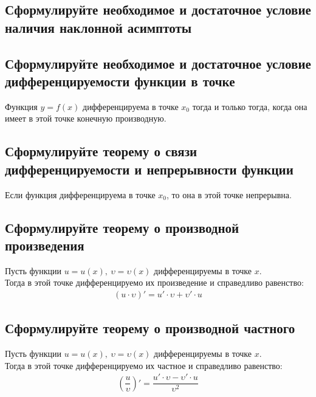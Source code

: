 \subsection{Сформулируйте необходимое и достаточное условие наличия наклонной асимптоты}
\begin{theorem}

\end{theorem}

\subsection{Сформулируйте необходимое и достаточное условие дифференцируемости функции в точке}
\begin{theorem}
	Функция $y=f(x)$ дифференцируема в точке $x_0$ тогда и только тогда, когда она имеет в этой точке конечную производную.
\end{theorem}

\subsection{Сформулируйте теорему о связи дифференцируемости и непрерывности функции}
\begin{theorem} 
	Если функция дифференцируема в точке $x_0$, то она в этой точке непрерывна.
\end{theorem}

\subsection{Сформулируйте теорему о производной произведения}
\begin{theorem}
	Пусть функции $u = u(x),\ \upsilon = \upsilon (x)$ дифференцируемы в точке $x$.\\
	Тогда в этой точке дифференцируемо их произведение и справедливо равенство:
	\begin{gather*}
		(u \cdot \upsilon)' = u'\cdot \upsilon + \upsilon' \cdot u
	\end{gather*}
\end{theorem}

\subsection{Сформулируйте теорему о производной частного}
\begin{theorem}
	Пусть функции $u = u(x),\ \upsilon = \upsilon (x)$ дифференцируемы в точке $x$.\\
	Тогда в этой точке дифференцируемо их частное и справедливо равенство:
	\begin{gather*}
		\left(\dfrac{u}{\upsilon}\right)' = \dfrac{u' \cdot \upsilon - \upsilon' \cdot u}{\upsilon^2}
	\end{gather*}
\end{theorem}


